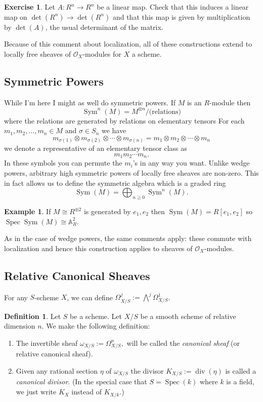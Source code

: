 \documentclass[12pt]{article}
\numberwithin{equation}{section}
\theoremstyle{definition}
\newtheorem{definition}[theorem]{Definition}
\newtheorem{example}[theorem]{Example}
\newtheorem{exercise}[theorem]{Exercise}
\theoremstyle{remark}
\newcommand{\Ocal}{\mathcal{O}}
\renewcommand{\AA}{\mathbb{A}}
\newcommand{\Spec}{\operatorname{Spec}}
\renewcommand{\div}{\operatorname{div}}
\newcommand{\Sym}{\operatorname{Sym}}
\begin{document}
\begin{exercise}
	Let $A:R^n \to R^n$ be a linear map. 
	Check that this induces a linear map on $\det(R^n) \to \det(R^n)$ and that this map is given by multiplication by $\det(A)$, the usual determinant of the matrix.
\end{exercise}

Because of this comment about localization, all of these constructions extend to locally free sheaves of $\Ocal_X$-modules for $X$ a scheme.

\subsection{Symmetric Powers}
While I'm here I might as well do symmetric powers. 
If $M$ is an $R$-module then 
 $$ \Sym^n(M) = M^{\otimes n}/\mbox{(relations)} $$
where the relations are generated by relations on elementary tensors 
For each $m_1,m_2,\ldots,m_n\in M$ and $\sigma\in S_n$ we have 
$$m_{\sigma(1)} \otimes m_{\sigma(2)} \otimes \cdots \otimes m_{\sigma(n)} = m_1\otimes m_2 \otimes \cdots \otimes m_n$$
we denote a representative of an elementary tensor class as 
 $$m_1m_2\cdots m_n. $$
 In these symbols you can permute the $m_i$'s in any way you want. 
 Unlike wedge powers, arbitrary high symmetric powers of locally free sheaves are non-zero. 
 This in fact allows us to define the symmetric algebra which is a graded ring 
  $$\Sym(M) = \bigoplus_{n\geq 0} \Sym^n(M).$$
  
\begin{example}
	If $M \cong R^{\oplus 2}$ is generated by $e_1,e_2$ then $\Sym(M) = R[e_1,e_2]$ so $\Spec \Sym(M) \cong \AA^2_R$.
\end{example}
As in the case of wedge powers, the same comments apply: these commute with localization and hence this construction applies to sheaves of $\Ocal_X$-modules. 

\subsection{Relative Canonical Sheaves}
For any $S$-scheme $X$, we can define $\Omega^j_{X/S} := \bigwedge^j \Omega^1_{X/S}$. 

\begin{definition}
	Let $S$ be a scheme.
	Let $X/S$ be a smooth scheme of relative dimension $n$.
	We make the following definition:
	\begin{enumerate}
		\item The invertible sheaf $\omega_{X/S}:= \Omega^n_{X/S},$ will be called the \emph{canonical sheaf} (or relative canonical sheaf). 
		\item Given any rational section $\eta$ of $\omega_{X/S}$ the divisor $ K_{X/S} := \div(\eta)$ is called a \emph{canonical divisor}. 
		(In the special case that $S = \Spec(k)$ where $k$ is a field, we just write $K_X$ instead of $K_{X/k}$.)
	\end{enumerate}
\end{definition} 
\end{document}
